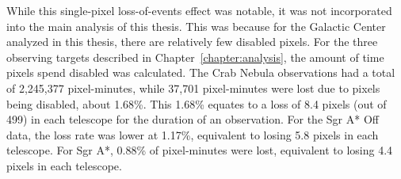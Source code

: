     
    
    While this single-pixel loss-of-events effect was notable, it was not incorporated into the main analysis of this thesis.
    This was because for the Galactic Center analyzed in this thesis, there are relatively few disabled pixels.
    For the three observing targets described in Chapter~\ref{chapter:analysis}, the amount of time pixels spend disabled was calculated.
    The Crab Nebula observations had a total of 2,245,377 pixel-minutes, while 37,701 pixel-minutes were lost due to pixels being disabled, about 1.68\%.
    This 1.68\% equates to a loss of 8.4 pixels (out of 499) in each telescope for the duration of an observation.
    For the Sgr A* Off data, the loss rate was lower at 1.17\%, equivalent to losing 5.8 pixels in each telescope.
    For Sgr A*, 0.88\% of pixel-minutes were lost, equivalent to losing 4.4 pixels in each telescope.

